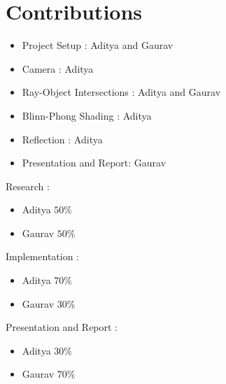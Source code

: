 \documentclass[a4paper]{article}
\begin{document}
\bigskip

\section{Contributions}
\begin{itemize}
    \item Project Setup : Aditya and Gaurav 
    \item Camera : Aditya
    \item Ray-Object Intersections : Aditya and Gaurav
    \item Blinn-Phong Shading : Aditya 
    \item Reflection : Aditya
    \item Presentation and Report: Gaurav 
\end{itemize}

Research :
\begin{itemize}
    \item Aditya $50\%$
    \item Gaurav $50\%$
\end{itemize} 
\vspace{\baselineskip}
Implementation : 
\begin{itemize}
    \item Aditya $70\%$
    \item Gaurav $30\%$
\end{itemize}
\vspace{\baselineskip}
Presentation and Report :
\begin{itemize}
    \item Aditya $30\%$
    \item Gaurav $70\%$
\end{itemize}

\bigskip

\printbibliography
\end{document}

